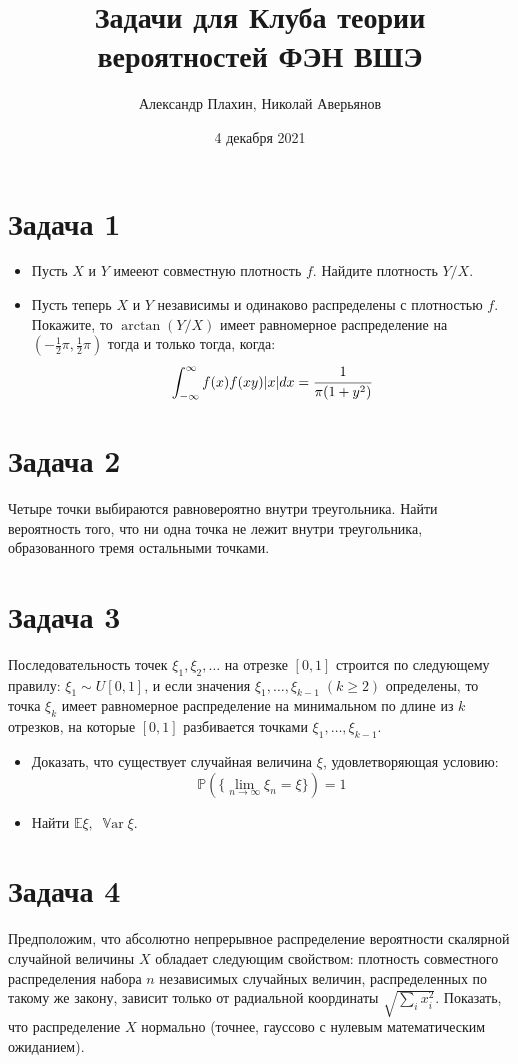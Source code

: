 \documentclass[a4paper, 12pt]{article}
\title{Задачи для Клуба теории вероятностей ФЭН ВШЭ}
\author{Александр Плахин, Николай Аверьянов}
\date{4 декабря 2021}
\newcommand{\E}{\mathbb{E}}
\renewcommand{\P}{\mathbb{P}}
\DeclareMathOperator{\Var}{\mathbb{V}ar}
\begin{document}
\maketitle

\section*{Задача 1}

\begin{itemize}
    \item Пусть $X$ и $Y$ имееют совместную плотность $f$. Найдите плотность $Y/X$.
    \item Пусть теперь $X$ и $Y$ независимы и одинаково распределены с плотностью $f$. Покажите, то $\arctan(Y/X)$ имеет равномерное распределение на $(-\frac{1}{2}\pi, \frac{1}{2}\pi)$ тогда и только тогда, когда:
    $$
    \int_{-\infty}^{\infty} f(x)f(xy)|x|dx = \cfrac{1}{\pi(1+y^2)}
    $$
\end{itemize}

\section*{Задача 2}
Четыре точки выбираются равновероятно внутри треугольника. Найти вероятность того, что ни одна точка не лежит внутри треугольника, образованного тремя остальными точками.

\section*{Задача 3}
Последовательность точек $\xi_1, \xi_2, \ldots$ на отрезке $[0, 1]$ строится по следующему правилу: $\xi_1 \sim U[0, 1]$, и если значения $\xi_1, \ldots, \xi_{k-1} \; (k \geq 2)$  определены, то точка $\xi_k$ имеет равномерное распределение на минимальном по длине из $k$ отрезков, на которые $[0, 1]$ разбивается точками $\xi_1, \ldots, \xi_{k-1}$.

\begin{itemize}
    \item Доказать, что существует случайная величина $\xi$, удовлетворяющая условию: 
    $$
    \P(\{\lim_{n \to \infty} \xi_n = \xi \}) = 1
    $$
    \item Найти $\E \xi, \; \Var \xi.$
\end{itemize}


\section*{Задача 4}
Предположим, что абсолютно непрерывное распределение вероятности скалярной случайной величины $X$ обладает следующим свойством: плотность совместного распределения набора $n$ независимых случайных величин, распределенных по такому же закону, зависит только от радиальной координаты $\sqrt{\sum_i x_i^2}$. Показать, что распределение $X$ нормально (точнее, гауссово с нулевым математическим ожиданием).
\end{document}
